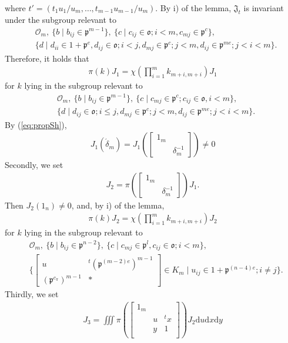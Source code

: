 \documentclass[11pt]{amsart}
\newcommand\oo{\mathfrak{o}}
\newcommand\Jf{\mathfrak{J}}
\newcommand\p{{\mathfrak{p}}}
\newcommand\dr{\mathrm{d}}
\newcommand\Oc{{\mathcal{O}}}
\newcommand\1{\mathbf{1}}
\newcommand\ac{\acute}
\numberwithin{equation}{section}
\begin{document}
where $t' = (t_1 u_1/u_m, \ldots, t_{m-1} u_{m-1}/u_m)$. 
By i) of the lemma, $\Jf_t$ is invariant under the subgroup relevant to 
\begin{align*}
& \Oc_m, \ \{b \mid b_{ij} \in \p^{m-1} \}, \ \{c \mid c_{ij} \in \oo; i <m, c_{mj} \in \p^c \}, \\
& \{d \mid d_{ii} \in 1+ \p^e, d_{ij} \in \oo; i < j, d_{mj} \in \p^c; j <m, d_{ij} \in \p^{me}; j < i < m \}.
\end{align*} 
Therefore, it holds that 
\begin{align*}
\pi(k)J_1 = \chi(\prod_{i=1}^m k_{m+i,m+i}) J_1
\end{align*} 
for $k$ lying in the subgroup relevant to 
\begin{align*}
& \Oc_m, \ \{b \mid b_{ij} \in \p^{m-1} \}, \ \{c \mid c_{mj} \in \p^c;  c_{ij} \in \oo,  i <m \}, \\
& 
\{d \mid d_{ij} \in \oo; i \le j, d_{mj} \in \p^c; j <m, d_{ij} \in \p^{me}; j < i < m \}.
\end{align*} 
By (\ref{eq:propSh}),
\begin{align*}
J_1(\ac{\delta}_m) = J_1(\begin{bmatrix}
1_m &  \\
& \delta_m^{-1}
\end{bmatrix}) \neq 0
\end{align*} 
Secondly, we set 
\begin{align*}
J_2 = \pi(\begin{bmatrix}
1_m &  \\
& \delta_m^{-1}
\end{bmatrix})J_1.
\end{align*}
Then $J_2(1_n) \neq 0$, and, by i) of the lemma, 
 \begin{align*}
\pi(k)J_2 = \chi(\prod_{i=1}^m k_{m+i,m+i}) J_2
\end{align*}  
for $k$ lying in the subgroup relevant to 
\begin{align*}
& \Oc_m, \ \{b \mid b_{ij} \in \p^{n-2} \}, \ \{c \mid c_{mj} \in \p^{l}, c_{ij} \in \oo; i <m \}, \\
& \{\begin{bmatrix}
 u& {}^t  (\p^{(m-2)e})^{m-1}  \\
(\p^{c_\pi})^{m-1} & *
\end{bmatrix} \in K_m \mid u_{ij} \in 1 + \p^{(n-4)e}; i \neq j \}.
\end{align*} 
Thirdly, we set 
\begin{align*}
J_3 = \iiint \pi(\begin{bmatrix}
1_m & & \\
 & u & {}^t x \\
 & y &1  \\
\end{bmatrix})J_2 \dr u \dr x \dr y
\end{align*} 
\end{document}
